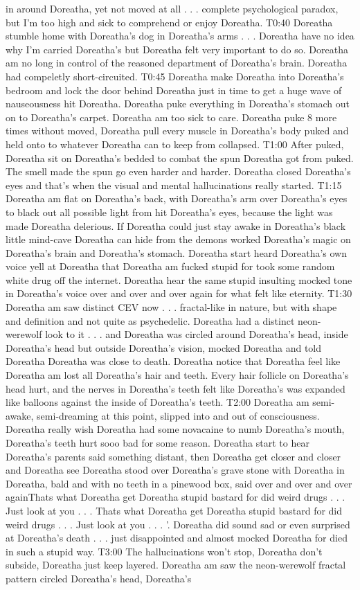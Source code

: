 \documentclass[12pt]{book}
\begin{document}
in around Doreatha, yet not moved at all . . .  complete psychological paradox, but I'm too high and sick to comprehend or enjoy Doreatha. T0:40 Doreatha stumble home with Doreatha's dog in Doreatha's arms . . .  Doreatha have no idea why I'm carried Doreatha's but Doreatha felt very important to do so. Doreatha am no long in control of the reasoned department of Doreatha's brain. Doreatha had compeletly short-circuited. T0:45 Doreatha make Doreatha into Doreatha's bedroom and lock the door behind Doreatha just in time to get a huge wave of nauseousness hit Doreatha. Doreatha puke everything in Doreatha's stomach out on to Doreatha's carpet. Doreatha am too sick to care. Doreatha puke 8 more times without moved, Doreatha pull every muscle in Doreatha's body puked and held onto to whatever Doreatha can to keep from collapsed. T1:00 After puked, Doreatha sit on Doreatha's bedded to combat the spun Doreatha got from puked. The smell made the spun go even harder and harder. Doreatha closed Doreatha's eyes and that's when the visual and mental hallucinations really started. T1:15 Doreatha am flat on Doreatha's back, with Doreatha's arm over Doreatha's eyes to black out all possible light from hit Doreatha's eyes, because the light was made Doreatha delerious. If Doreatha could just stay awake in Doreatha's black little mind-cave Doreatha can hide from the demons worked Doreatha's magic on Doreatha's brain and Doreatha's stomach. Doreatha start heard Doreatha's own voice yell at Doreatha that Doreatha am fucked stupid for took some random white drug off the internet. Doreatha hear the same stupid insulting mocked tone in Doreatha's voice over and over and over again for what felt like eternity. T1:30 Doreatha am saw distinct CEV now . . .  fractal-like in nature, but with shape and definition and not quite as psychedelic. Doreatha had a distinct neon-werewolf look to it . . .  and Doreatha was circled around Doreatha's head, inside Doreatha's head but outside Doreatha's vision, mocked Doreatha and told Doreatha Doreatha was close to death. Doreatha notice that Doreatha feel like Doreatha am lost all Doreatha's hair and teeth. Every hair follicle on Doreatha's head hurt, and the nerves in Doreatha's teeth felt like Doreatha's was expanded like balloons against the inside of Doreatha's teeth. T2:00 Doreatha am semi-awake, semi-dreaming at this point, slipped into and out of consciousness. Doreatha really wish Doreatha had some novacaine to numb Doreatha's mouth, Doreatha's teeth hurt sooo bad for some reason. Doreatha start to hear Doreatha's parents said something distant, then Doreatha get closer and closer and Doreatha see Doreatha stood over Doreatha's grave stone with Doreatha in Doreatha, bald and with no teeth in a pinewood box, said over and over and over againThats what Doreatha get Doreatha stupid bastard for did weird drugs . . .  Just look at you . . .  Thats what Doreatha get Doreatha stupid bastard for did weird drugs . . .  Just look at you . . .  '. Doreatha did sound sad or even surprised at Doreatha's death . . .  just disappointed and almost mocked Doreatha for died in such a stupid way. T3:00 The hallucinations won't stop, Doreatha don't subside, Doreatha just keep layered. Doreatha am saw the neon-werewolf fractal pattern circled Doreatha's head, Doreatha's 
\end{document}
